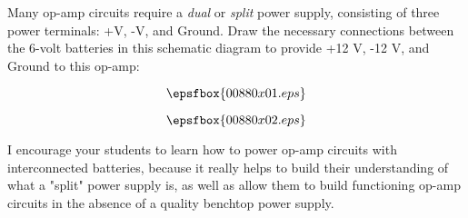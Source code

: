 

Many op-amp circuits require a {\it dual} or {\it split} power supply, consisting of three power terminals: +V, -V, and Ground.  Draw the necessary connections between the 6-volt batteries in this schematic diagram to provide +12 V, -12 V, and Ground to this op-amp:

\vskip 30pt

$$\epsfbox{00880x01.eps}$$

\vskip 30pt







$$\epsfbox{00880x02.eps}$$







I encourage your students to learn how to power op-amp circuits with interconnected batteries, because it really helps to build their understanding of what a "split" power supply is, as well as allow them to build functioning op-amp circuits in the absence of a quality benchtop power supply.




